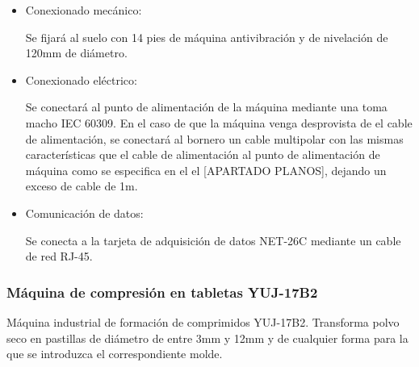 		\begin{itemize}
				\item{Conexionado mecánico:}
				
				Se fijará al suelo con 14 pies de máquina antivibración y de nivelación de 120mm de diámetro.

				\item{Conexionado eléctrico:}

				Se conectará al punto de alimentación de la máquina mediante una  toma macho IEC 60309. En el caso de que la máquina venga desprovista de el cable de alimentación, se conectará al bornero un cable multipolar con las mismas características que el cable de alimentación al punto de alimentación de máquina como se especifica en el el [APARTADO PLANOS], dejando un exceso de cable de 1m. \
				
				\item{Comunicación de datos:}

				Se conecta a la tarjeta de adquisición de datos NET-26C mediante un cable de red RJ-45.
				
		\end{itemize}

	\newpage

	\subsubsection{Máquina de compresión en tabletas YUJ-17B2}

	

	Máquina industrial de formación de comprimidos YUJ-17B2. Transforma polvo seco en pastillas de diámetro de entre 3mm y 12mm y de cualquier forma para la que se introduzca el correspondiente molde.\\

